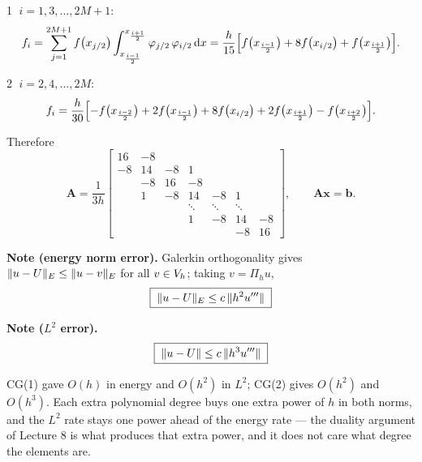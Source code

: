 \textcircled{\scriptsize1}\; $i=1,3,\dots,2M+1$:
\begin{equation}\label{eq:l10fodd}
  f_{i}=\sum_{j=1}^{2M+1}f\bigl(x_{j/2}\bigr)
        \int_{x_{\frac{i-1}{2}}}^{x_{\frac{i+1}{2}}}\varphi_{j/2}\,\varphi_{i/2}\,\mathrm{d} x
      =\frac{h}{15}\Bigl[f\bigl(x_{\frac{i-1}{2}}\bigr)
        +8f\bigl(x_{i/2}\bigr)+f\bigl(x_{\frac{i+1}{2}}\bigr)\Bigr].
\end{equation}

\textcircled{\scriptsize2}\; $i=2,4,\dots,2M$:
\begin{equation}\label{eq:l10feven}
  f_{i}=\frac{h}{30}\Bigl[-f\bigl(x_{\frac{i-2}{2}}\bigr)
        +2f\bigl(x_{\frac{i-1}{2}}\bigr)+8f\bigl(x_{i/2}\bigr)
        +2f\bigl(x_{\frac{i+1}{2}}\bigr)-f\bigl(x_{\frac{i+2}{2}}\bigr)\Bigr].
\end{equation}

\medskip\noindent
Therefore
\begin{equation}\label{eq:l10Amat}
  \bm{A}=\frac{1}{3h}
  \begin{bmatrix}
    16 & -8 &    &    &    &    &   \\
    -8 & 14 & -8 &  1 &    &    &   \\
       & -8 & 16 & -8 &    &    &   \\
       &  1 & -8 & 14 & -8 &  1 &   \\
       &    &    & \ddots & \ddots & \ddots & \\
       &    &    &  1 & -8 & 14 & -8\\
       &    &    &    &    & -8 & 16
  \end{bmatrix},
  \qquad \bm{A}\bm{x}=\bm{b}.
\end{equation}

\medskip\noindent
\textbf{Note (energy norm error).} Galerkin orthogonality gives
$\lVert u-U\rVert_{E}\le\lVert u-v\rVert_{E}$ for all $v\in V_{h}$; taking $v=\Pi_h u$,
\begin{equation}\label{eq:l10eng}
  \boxed{\;\lVert u-U\rVert_{E}\le c\,\lVert h^{2}u'''\rVert\;}
\end{equation}

\noindent
\textbf{Note ($L^{2}$ error).}
\begin{equation}\label{eq:l10l2}
  \boxed{\;\lVert u-U\rVert\le c\,\lVert h^{3}u'''\rVert\;}
\end{equation}

\begin{intuition}
CG(1) gave $O(h)$ in energy and $O(h^{2})$ in $L^{2}$; CG(2) gives $O(h^{2})$
and $O(h^{3})$. Each extra polynomial degree buys one extra power of $h$ in both
norms, and the $L^{2}$ rate stays one power ahead of the energy rate --- the
duality argument of Lecture 8 is what produces that extra power, and it does not
care what degree the elements are.
\end{intuition}

